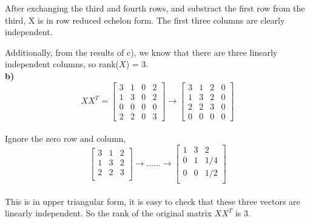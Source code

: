 \documentclass[paper=a4, fontsize=11pt]{scrartcl} %
\numberwithin{equation}{section} %
\numberwithin{figure}{section} %
\numberwithin{table}{section} %
\begin{document}
After exchanging the third and fourth rows, and substract the first row from the third, X is in row reduced echelon form. The first three columns are clearly independent. 

Additionally, from the results of c), we know that there are three linearly independent columns, so rank($X$) = 3. \\

\textbf{b)} 
$$
X X^T = 
\begin{bmatrix}
3 & 1 & 0 & 2 \\
1 & 3 & 0 & 2 \\
0 & 0 & 0 & 0 \\
2 & 2 & 0 & 3 
\end{bmatrix}
\rightarrow
\begin{bmatrix}
3 & 1 & 2 & 0 \\
1 & 3 & 2 & 0 \\
2 & 2 & 3 & 0 \\
0 & 0 & 0 & 0 
\end{bmatrix}
$$\\

Ignore the zero row and column, 
$$
\begin{bmatrix}
3 & 1 & 2 \\
1 & 3 & 2 \\
2 & 2 & 3 \\
\end{bmatrix}
\rightarrow ...... \rightarrow 
\begin{bmatrix}
1 & 3 & 2 \\
0 & 1 & 1/4 \\
0 & 0 & 1/2 \\
\end{bmatrix}
$$\\

This is in upper triangular form, it is easy to check that these three vectors are linearly independent. So the rank of the original matrix $XX^T$ is 3. \\
\end{document}
